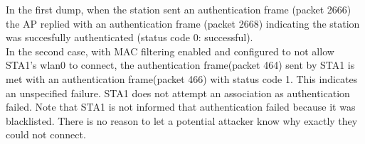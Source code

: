 In the first dump, when the station sent an authentication frame (packet 2666) the AP replied with an authentication frame (packet 2668) indicating the station was succesfully authenticated (status code 0: successful).\\
In the second case, with MAC filtering enabled and configured to not allow STA1's wlan0 to connect,
the authentication frame(packet 464) sent by STA1 is met with an authentication frame(packet 466)
with status code 1. This indicates an unspecified failure. STA1 does not attempt an association as authentication failed. Note that STA1 is not informed that authentication failed because it was blacklisted. There is no reason to let a potential attacker know why exactly they could not connect.
